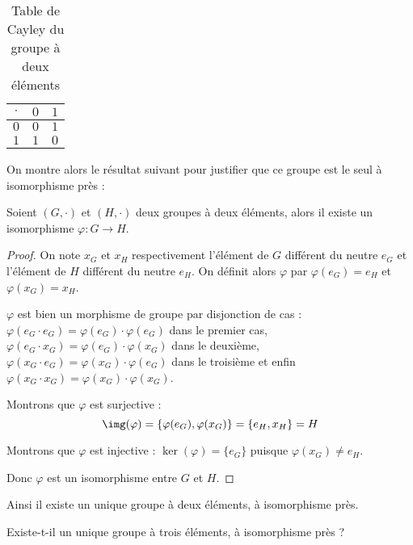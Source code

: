 \begin{table}[ht]
            \centering
            \begin{tabular}{| c | c  c |}
                \hline
                $\cdot$ & $0$ & $1$\\
                \hline
                $0$ & $0$ & $1$\\
                $1$ & $1$ & $0$\\
                \hline
            \end{tabular}
            \caption{Table de Cayley du groupe à deux éléments}
    \end{table}

On montre alors le résultat suivant pour justifier que ce groupe est le seul à isomorphisme près :

\begin{prop}
    Soient $(G,\cdot)$ et $(H,\cdot)$ deux groupes à deux éléments, alors il existe un isomorphisme $\varphi : G \to H$.
\end{prop}

\begin{proof}
    On note $x_G$ et $x_H$ respectivement l'élément de $G$ différent du neutre $e_G$ et l'élément de $H$ différent du neutre $e_H$. On définit alors $\varphi$ par $\varphi(e_G) = e_H$ et $\varphi(x_G)=x_H$.

    $\varphi$ est bien un morphisme de groupe par disjonction de cas : $\varphi(e_G\cdot e_G) = \varphi(e_G)\cdot \varphi(e_G)$ dans le premier cas, $\varphi(e_G\cdot x_G) = \varphi(e_G)\cdot \varphi(x_G)$ dans le deuxième, $\varphi(x_G\cdot e_G) = \varphi(x_G)\cdot \varphi(e_G)$ dans le troisième et enfin $\varphi(x_G\cdot x_G) = \varphi(x_G)\cdot \varphi(x_G)$.

    Montrons que $\varphi$ est surjective : $$\img(\varphi) = \{\varphi(e_G),\varphi(x_G)\} = \{e_H,x_H\} = H$$

    Montrons que $\varphi$ est injective : $\ker(\varphi) = \{e_G\}$ puisque $\varphi(x_G)\neq e_H$.

    Donc $\varphi$ est un isomorphisme entre $G$ et $H$.
\end{proof}

Ainsi il existe un unique groupe à deux éléments, à isomorphisme près.

\begin{exo}[*]
    Existe-t-il un unique groupe à trois éléments, à isomorphisme près ?
\end{exo}

\newpage